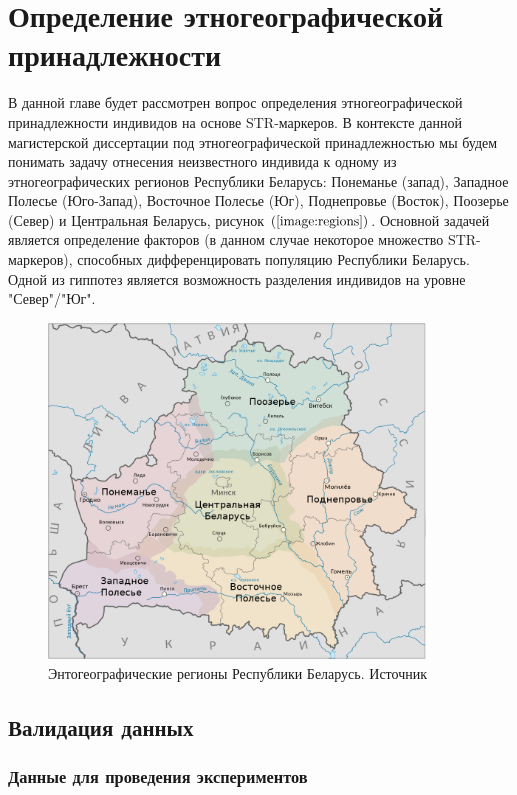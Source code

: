 \chapter{Определение этногеографической принадлежности}

В данной главе будет рассмотрен вопрос определения этногеографической принадлежности
индивидов на основе STR-маркеров. В контексте данной магистерской диссертации под
этногеографической принадлежностью мы будем понимать задачу отнесения неизвестного
индивида к одному из этногеографических регионов Республики Беларусь: Понеманье (запад),
Западное Полесье (Юго-Запад), Восточное Полесье (Юг), Поднепровье (Восток), Поозерье (Север) и
Центральная Беларусь, рисунок $\left(\ref{image:regions}\right)$. Основной задачей является определение факторов (в данном случае некоторое
множество STR-маркеров), способных дифференцировать популяцию Республики Беларусь. Одной из гиппотез
является возможность разделения индивидов на уровне "Север"/"Юг".


\begin{figure}[h]
\begin{center}
\includegraphics[width=10cm]{images/belarus_regions.png}
\end{center}
  \caption{Энтогеографические регионы Республики Беларусь. Источник}
  \label{image:regions}
\end{figure}

\section{Валидация данных}

\subsection{Данные для проведения экспериментов}

